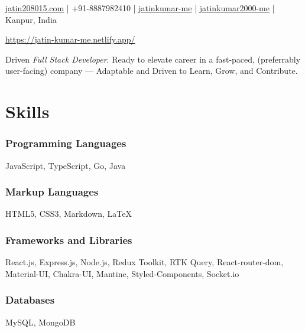 \documentclass[a4paper]{article}
\author{Jatin Kumar}
\begin{document}
\begin{center}
	\makeatletter
	\centering {\huge \@author}
	\makeatother
	\vspace{6pt}

	\href{mailto:jatin208015\@gmail.com}{{\faAt} jatin208015\@gmail.com} |
	{\faPhone } +91-8887982410 |
	\href{https://github.com/jatinkumar-me}{{\faGithub} jatinkumar-me} |
	\href{https://www.linkedin.com/in/jatinkumar-2000-me/}{{\faLinkedin} {jatinkumar2000-me}} |
	{\faMapMarker} Kanpur, India

	\href{https://jatin-kumar-me.netlify.app/}{{\faGlobe} https://jatin-kumar-me.netlify.app/}
\end{center}

\vspace{-13pt}
\hrulefill
\vspace{-8pt}

\begin{center}
Driven \textit{Full Stack Developer}. Ready to elevate career in a fast-paced, (preferrably user-facing) company — Adaptable and Driven to Learn, Grow, and Contribute.
\end{center}

\section{Skills}
\subsubsection*{Programming Languages}
JavaScript, TypeScript, Go, Java
\vspace{-10pt}
\subsubsection*{Markup Languages}
HTML5, CSS3, Markdown, \LaTeX
\vspace{-10pt}
\subsubsection*{Frameworks and Libraries}
React.js, Express.js, Node.js, Redux Toolkit, RTK Query, React-router-dom, Material-UI, Chakra-UI, Mantine, Styled-Components, Socket.io
\vspace{-10pt}
\subsubsection*{Databases}
MySQL, MongoDB
\vspace{-10pt}
\end{document}
